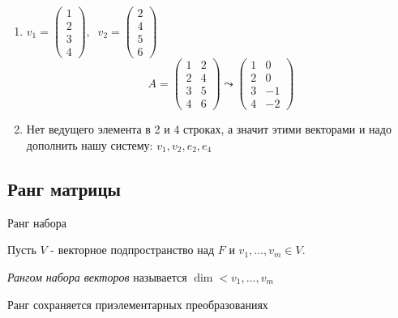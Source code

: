 \begin{problem}
\begin{example}
        \begin{enumerate}
            \item $v_1 = \begin{pmatrix}
                1 \\ 2 \\ 3 \\ 4
            \end{pmatrix}, \;\; v_2 = \begin{pmatrix}
                2 \\ 4 \\ 5 \\ 6
            \end{pmatrix}$
            $$A = \begin{pmatrix}
                1 & 2 \\
                2 & 4 \\
                3 & 5 \\
                4 & 6
            \end{pmatrix} \leadsto \begin{pmatrix}
                1 & 0 \\
                2 & 0 \\
                3 & -1 \\
                4 & -2
            \end{pmatrix}$$
            \item Нет ведущего элемента в 2 и 4 строках, а значит этими векторами и надо дополнить нашу систему: $v_1, v_2, e_2, e_4$
        \end{enumerate}
        
    \end{example}

    \bigskip

    \begin{comment}~
        Дополнение до базиса не единственное. Вместо любого дополняющего набора можно взять любые векторы из его линейной оболочки
    \end{comment}

\end{problem}


\bigskip


\subsection{Ранг матрицы}

\begin{definition} Ранг набора
    
    Пусть $V$ - векторное подпространство над $F$ и $v_1, \dots, v_m \in V$.

    \textit{Рангом набора векторов} называется $\dim<v_1, \dots, v_m$

    Ранг сохраняется приэлементарных преобразованиях

\end{definition}


